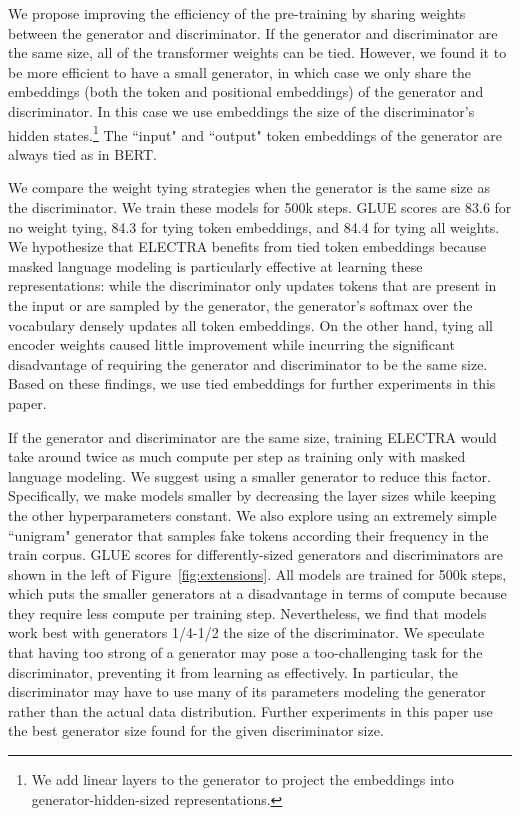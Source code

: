 \documentclass{article}
\newcommand{\xhdr}[1]{\vspace{0mm}\noindent{{\bf #1}}\hspace{1.3mm}}
\begin{document}
\xhdr{Weight Sharing}
We propose improving the efficiency of the pre-training by sharing weights between the generator and discriminator. 
If the generator and discriminator are the same size, all of the transformer weights can be tied.
However, we found it to be more efficient to have a small generator, in which case we only share the embeddings (both the token and positional embeddings) of the generator and discriminator.
In this case we use embeddings the size of the discriminator's hidden states.\footnote{We add linear layers to the generator to project the embeddings into generator-hidden-sized representations.}
The ``input" and ``output" token embeddings of the generator are always tied as in BERT. 

We compare the weight tying strategies when the generator is the same size as the discriminator. We train these models for 500k steps. GLUE scores are 83.6 for no weight tying, 84.3 for tying token embeddings, and 84.4 for tying all weights.
We hypothesize that ELECTRA benefits from tied token embeddings because masked language modeling is particularly effective at learning these representations: while the discriminator only updates tokens that are present in the input or are sampled by the generator, the generator's softmax over the vocabulary densely updates all token embeddings. 
On the other hand, tying all encoder weights caused little improvement while incurring the significant disadvantage of requiring the generator and discriminator to be the same size. 
Based on these findings, we use tied embeddings for further experiments in this paper. 

\xhdr{Smaller Generators}
If the generator and discriminator are the same size, training ELECTRA would take around twice as much compute per step as training only with masked language modeling.
We suggest using a smaller generator to reduce this factor.
Specifically, we make models smaller by decreasing the layer sizes while keeping the other hyperparameters constant.
We also explore using an extremely simple ``unigram" generator that samples fake tokens according their frequency in the train corpus. 
GLUE scores for differently-sized generators and discriminators are shown in the left of Figure~\ref{fig:extensions}.
All models are trained for 500k steps, which puts the smaller generators at a disadvantage in terms of compute because they require less compute per training step.
Nevertheless, we find that models work best with generators 1/4-1/2 the size of the discriminator. 
We speculate that having too strong of a generator may pose a too-challenging task for the discriminator, preventing it from learning as effectively.
In particular, the discriminator may have to use many of its parameters modeling the generator rather than the actual data distribution.
Further experiments in this paper use the best generator size found for the given discriminator size.
\end{document}
